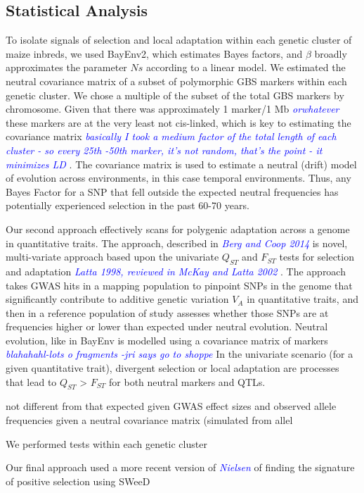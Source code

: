 \documentclass[9pt,twocolumn,twoside]{gsajnl}
\newcommand{\kc}[1]{\textcolor{blue}{ \emph{ #1}} }
\begin{document}
\subsection*{Statistical Analysis} 
To isolate signals of selection and local adaptation within each genetic cluster of maize inbreds,  we used BayEnv2, which estimates Bayes factors, and $\beta$ broadly approximates the parameter $Ns$ according to a linear model. 
We estimated the neutral covariance matrix of a subset of polymorphic GBS markers within each genetic cluster. We chose a multiple of the subset of the total GBS markers by chromosome. Given that there was approximately 1 marker/1 Mb \kc{orwhatever} these markers are at the very least not cis-linked, which is key to estimating the covariance matrix \kc{basically I took a medium factor of the total length of each cluster - so every 25th -50th marker, it's not random, that's the point - it minimizes LD}. 
The covariance matrix is used to estimate a neutral (drift) model of evolution across environments, in this case temporal environments. 
Thus, any Bayes Factor for a SNP that fell outside the expected neutral frequencies has potentially experienced selection in the past 60-70 years.

Our second approach effectively scans for polygenic adaptation across a genome in quantitative traits. The approach, described in \kc{Berg and Coop 2014} is novel, multi-variate approach based upon the univariate $Q_{ST}$ and $F_{ST}$ tests for selection and adaptation \kc{Latta 1998, reviewed in McKay and Latta 2002}. 
The approach takes GWAS hits in a mapping population to pinpoint SNPs in the genome that significantly contribute to additive genetic variation $V_A$ in quantitative traits, and then in a reference population of study assesses whether those SNPs are at frequencies higher or lower than expected under neutral evolution. Neutral evolution, like in BayEnv is modelled using a covariance matrix of markers \kc{blahahahl-lots o fragments -jri says go to shoppe}
In the univariate scenario (for a given quantitative trait), divergent selection or local adaptation are processes that lead to $Q_{ST}$ > $F_{ST}$ for both neutral markers and QTLs.   

not different from that expected given GWAS effect sizes and observed allele frequencies given a neutral covariance matrix (simulated from allel

We performed tests within each genetic cluster

Our final approach used a more recent version of \kc{Nielsen} of finding the signature of positive selection using SWeeD
\end{document}
